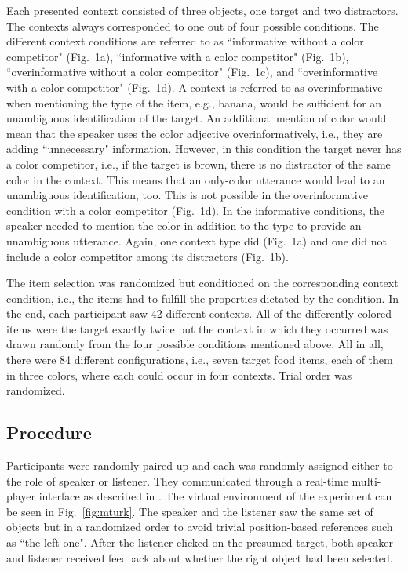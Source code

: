 \documentclass[10pt,letterpaper]{article}
\newcommand{\figref}[1]{Fig.~\ref{#1}}
\begin{document}
Each presented context consisted of three objects, one target and two distractors. The contexts always corresponded to one out of four possible conditions. The different context conditions are referred to as ``informative without a color competitor" (Fig.~1a), ``informative with a color competitor" (Fig.~1b), ``overinformative without a color competitor" (Fig.~1c), and ``overinformative with a color competitor" (Fig.~1d). A context is referred to as overinformative when mentioning the type of the item, e.g., banana, would be sufficient for an unambiguous identification of the target. An additional mention of color would mean that the speaker uses the color adjective overinformatively, i.e., they are adding ``unnecessary" information. However, in this condition the target never has a color competitor, i.e., if the target is brown, there is no distractor of the same color in the context. This means that an only-color utterance would lead to an unambiguous identification, too. This is not possible in the overinformative condition with a color competitor (Fig.~1d). In the informative conditions, the speaker needed to mention the color in addition to the type to provide an unambiguous utterance. Again, one context type did (Fig.~1a) and one did not include a color competitor among its distractors (Fig.~1b).

The item selection was randomized but conditioned on the corresponding context condition, i.e., the items had to fulfill the properties dictated by the condition. In the end, each participant saw 42 different contexts. All of the differently colored items were the target exactly twice but the context in which they occurred was drawn randomly from the four possible conditions mentioned above. All in all, there were 84 different configurations, i.e., seven target food items, each of them in three colors, where each could occur in four contexts. Trial order was randomized.


\subsection{Procedure}

Participants were randomly paired up and each was randomly assigned either to the role of  speaker or listener. They communicated through a real-time multi-player interface as described in . The virtual environment of the experiment can be seen in \figref{fig:mturk}. The speaker and the listener saw the same set of objects but in a randomized order to avoid trivial position-based references such as ``the left one". After the listener clicked on the presumed target, both speaker and listener received feedback about whether the right object had been selected.
\end{document}
